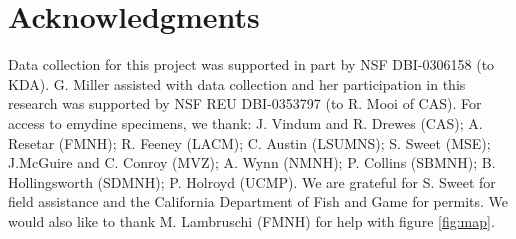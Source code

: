 \documentclass[10pt,letterpaper]{article}
\begin{document}
\section*{Acknowledgments}
Data collection for this project was supported in part by NSF DBI-0306158 (to KDA). G. Miller assisted with data collection and her participation in this research was supported by NSF REU DBI-0353797 (to R. Mooi of CAS). For access to emydine specimens, we thank: J. Vindum and R. Drewes (CAS); A. Resetar (FMNH); R. Feeney (LACM); C. Austin (LSUMNS); S. Sweet (MSE); J.McGuire and C. Conroy (MVZ); A. Wynn (NMNH); P. Collins (SBMNH); B. Hollingsworth (SDMNH); P. Holroyd (UCMP). We are grateful for S. Sweet for field assistance and the California Department of Fish and Game for permits. We would also like to thank M. Lambruschi (FMNH) for help with figure \ref{fig:map}.

\nolinenumbers
\end{document}

